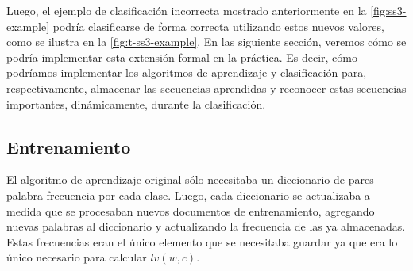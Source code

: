 Luego, el ejemplo de clasificación incorrecta mostrado anteriormente en la \autoref{fig:ss3-example} podría clasificarse de forma correcta utilizando estos nuevos valores, como se ilustra en la \autoref{fig:t-ss3-example}.
En las siguiente sección, veremos cómo se podría implementar esta extensión formal en la práctica. Es decir, cómo podríamos implementar los algoritmos de aprendizaje y clasificación para, respectivamente, almacenar las secuencias aprendidas y reconocer estas secuencias importantes, dinámicamente, durante la clasificación.


\subsection{Entrenamiento}


El algoritmo de aprendizaje original sólo necesitaba un diccionario de pares palabra-frecuencia por cada clase.
Luego, cada diccionario se actualizaba a medida que se procesaban nuevos documentos de entrenamiento, agregando nuevas palabras al diccionario y actualizando la frecuencia de las ya almacenadas.
Estas frecuencias eran el único elemento que se necesitaba guardar ya que era lo único necesario para calcular $lv(w,c)$.

